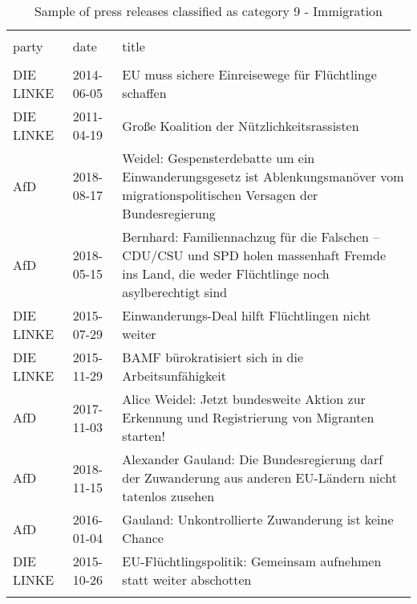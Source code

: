 
\begin{table}[!htbp] \centering 
  \caption{Sample of press releases classified as category 9 - Immigration} 
  \label{tab:7-document-samples} 
\begin{tabularx}{\textwidth}{XXX} 
\\[-1.8ex]\hline 
\hline \\[-1.8ex] 
party & date & title \\ 
\hline \\[-1.8ex] 
DIE LINKE & 2014-06-05 & EU muss sichere Einreisewege für Flüchtlinge schaffen \\ 
DIE LINKE & 2011-04-19 & Große Koalition der Nützlichkeitsrassisten \\ 
AfD & 2018-08-17 & Weidel: Gespensterdebatte um ein Einwanderungsgesetz ist Ablenkungsmanöver vom migrationspolitischen Versagen der Bundesregierung \\ 
AfD & 2018-05-15 & Bernhard: Familiennachzug für die Falschen – CDU/CSU und SPD holen massenhaft Fremde ins Land, die weder Flüchtlinge noch asylberechtigt sind \\ 
DIE LINKE & 2015-07-29 & Einwanderungs-Deal hilft Flüchtlingen nicht weiter \\ 
DIE LINKE & 2015-11-29 & BAMF bürokratisiert sich in die Arbeitsunfähigkeit \\ 
AfD & 2017-11-03 & Alice Weidel: Jetzt bundesweite Aktion zur Erkennung und Registrierung von Migranten starten! \\ 
AfD & 2018-11-15 & Alexander Gauland: Die Bundesregierung darf der Zuwanderung aus anderen EU-Ländern nicht tatenlos zusehen \\ 
AfD & 2016-01-04 & Gauland: Unkontrollierte Zuwanderung ist keine Chance \\ 
DIE LINKE & 2015-10-26 & EU-Flüchtlingspolitik: Gemeinsam aufnehmen statt weiter abschotten \\ 
\hline \\[-1.8ex] 
\end{tabularx} 
\end{table} 

